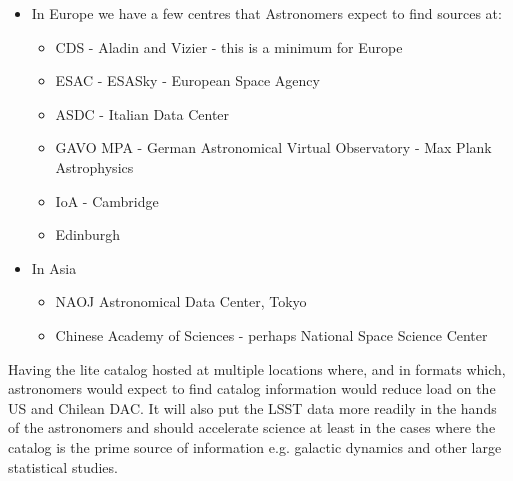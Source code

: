 \begin{itemize}
\item In Europe we have a few centres that Astronomers expect to find sources at:
\begin{itemize}
    \item CDS  - Aladin and Vizier - this is a minimum for Europe
    \item ESAC - ESASky - European Space Agency
    \item  ASDC - Italian Data Center
    \item  GAVO MPA - German Astronomical Virtual Observatory - Max Plank Astrophysics
    \item  IoA - Cambridge
    \item  Edinburgh
\end{itemize}
\item In Asia
\begin{itemize}
    \item  NAOJ Astronomical Data Center, Tokyo
    \item  Chinese Academy of Sciences - perhaps National Space Science Center
\end{itemize}
\end{itemize}


Having the lite catalog hosted at multiple locations where, and in formats which, astronomers would expect to find catalog information would reduce load on the US and Chilean DAC.
 It will also put the LSST data more readily in the hands of the astronomers and should accelerate science at least in the cases where the catalog is the prime source of information e.g. galactic dynamics and other large statistical studies.

